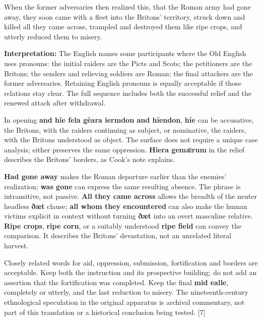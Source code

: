 When the former adversaries then realized this, that the Roman army had gone away, they soon came with a fleet into the Britons' territory, struck down and killed all they came across, trampled and destroyed them like ripe crops, and utterly reduced them to misery.

\textbf{Interpretation:} The English names some participants where the Old English uses pronouns: the initial raiders are the Picts and Scots; the petitioners are the Britons; the senders and relieving soldiers are Roman; the final attackers are the former adversaries. Retaining English pronouns is equally acceptable if those relations stay clear. The full sequence includes both the successful relief and the renewed attack after withdrawal.

In opening \textbf{and hīe fela gēara iermdon and hīendon}, \textbf{hīe} can be accusative, the Britons, with the raiders continuing as subject, or nominative, the raiders, with the Britons understood as object. The surface does not require a unique case analysis; either preserves the same oppression. \textbf{Hiera gemǣrum} in the relief describes the Britons' borders, as Cook's note explains.

\textbf{Had gone away} makes the Roman departure earlier than the enemies' realization; \textbf{was gone} can express the same resulting absence. The phrase is intransitive, not passive. \textbf{All they came across} allows the breadth of the neuter headless \textbf{ðæt} clause; \textbf{all whom they encountered} can also make the human victims explicit in context without turning \textbf{ðæt} into an overt masculine relative. \textbf{Ripe crops}, \textbf{ripe corn}, or a suitably understood \textbf{ripe field} can convey the comparison. It describes the Britons' devastation, not an unrelated literal harvest.

Closely related words for aid, oppression, submission, fortification and borders are acceptable. Keep both the instruction and its prospective building; do not add an assertion that the fortification was completed. Keep the final \textbf{mid ealle}, completely or utterly, and the last reduction to misery. The nineteenth-century ethnological speculation in the original apparatus is archival commentary, not part of this translation or a historical conclusion being tested. [7]

